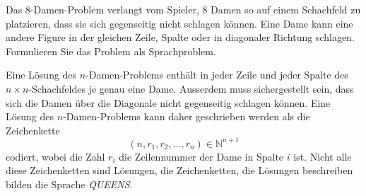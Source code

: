 Das 8-Damen-Problem verlangt vom Spieler, 8 Damen so auf einem Schachfeld
zu platzieren, dass sie sich gegenseitig nicht schlagen können.
Eine Dame kann eine andere Figure in der gleichen Zeile, Spalte oder
in diagonaler Richtung schlagen.
Formulieren Sie das Problem als Sprachproblem.

\begin{loesung}
Eine Lösung des $n$-Damen-Problems enthält in jeder Zeile und
jeder Spalte des $n\times n$-Schachfeldes je genau eine Dame.
Ausserdem muss sichergestellt sein, dass sich die Damen über
die Diagonale nicht gegenseitig schlagen können.
Eine Lösung des $n$-Damen-Problems kann daher geschrieben werden
als die Zeichenkette
\[
(n,r_1,r_2,\dots,r_n) \in \mathbb{N}^{n+1}
\]
codiert, wobei die Zahl $r_i$ die Zeilennummer der Dame in Spalte $i$
ist.
Nicht alle diese Zeichenketten sind Lösungen, die Zeichenketten, die
Lösungen beschreiben bilden die Sprache \textit{QUEENS}.
\end{loesung}
